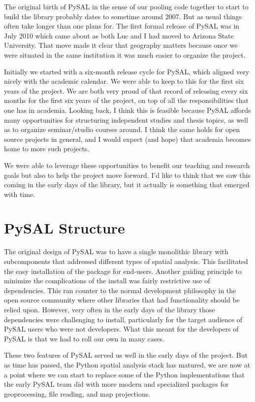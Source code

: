 \documentclass[11pt]{article}
\begin{document}
The original birth of PySAL in the sense of our pooling code together to start
to build the library probably dates to sometime around 2007. But as
usual things often take longer than one plans for. The first formal release of
PySAL was in July 2010 which came about as both Luc and I had moved to Arizona
State University. That move made it clear that geography matters because once
we were situated in the same institution it was much easier to organize the
project.

Initially we started with a six-month release cycle for PySAL, which aligned
very nicely with the academic calendar. We were able to keep to this for the
first six years of the project. We are both very proud of that record of
releasing every six months for the first six years of the project, on top of
all the responsibilities that one has in academia. Looking back, I think this
is feasible because PySAL affords many opportunities for structuring
independent studies and thesis topics, as well as to organize seminar/studio
courses around. I think the same holds for open source projects in general, and
I would expect (and hope) that academia becomes home to more such projects.

We were able to leverage these opportunities to benefit our teaching and
research goals but also to help the project move forward. I'd like to think
that we saw this coming in the early days of the library, but it actually is
something that emerged with time.
\section*{PySAL Structure}
\label{sec:orgc598589}
The original design of PySAL was to have a single monolithic library with
subcomponents that addressed different types of spatial analysis. This
facilitated the easy installation of the package for end-users. Another guiding
principle to minimize the complications of the install was fairly restrictive
use of dependencies. This ran counter to the normal development philosophy in
the open source community where other libraries that had functionality should be
relied upon. However, very often in the early days of the library 
those dependencies were challenging to install, particularly for the target
audience of PySAL users who were not developers. What this meant for the
developers of PySAL is that we had to roll our own in many cases.

These two features of PySAL served us well in the early days of the project.
But as time has passed, the Python spatial analysis stack has matured, we are
now at a point where we can start to replace some of the Python implementations
that the early PySAL team did with more modern and specialized packages for
geoprocessing, file reading, and map projections.
\end{document}
